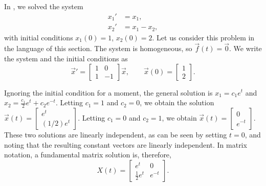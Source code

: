 \begin{example}
In , we solved the system
\begin{align*}
x_1' & = x_1 , \\
x_2' & = x_1 - x_2 ,
\end{align*}
with initial conditions $x_1(0) = 1$, $x_2(0) = 2$.
Let us consider this problem in the language of this section.
The system is homogeneous, so $\vec{f}(t) = \vec{0}$.
We write the system and the initial conditions as
\begin{equation*}
{\vec{x}}'
=
\begin{bmatrix}
1 & 0 \\
1 & -1
\end{bmatrix}
\vec{x} ,
\qquad
\vec{x}(0) = 
\begin{bmatrix}
1 \\
2
\end{bmatrix} .
\end{equation*}

Ignoring the initial condition for a moment,
the general solution is
$x_1 = c_1 e^t $ and
$x_2 = \frac{c_1}{2}e^{t} + c_2e^{-t}$. 
Letting $c_1=1$ and $c_2=0$, we obtain the solution
$\vec{x}(t) = \left[ \begin{smallmatrix} e^t \\ (1/2) e^t \end{smallmatrix} \right]$.
Letting $c_1=0$ and $c_2=1$, we obtain
$\vec{x}(t) = \left[ \begin{smallmatrix} 0 \\ e^{-t} \end{smallmatrix} \right]$.
These two solutions are linearly independent,
as can be seen by setting
$t=0$, and noting that the resulting constant vectors are
linearly independent.
In matrix notation, a fundamental matrix solution is, therefore,
\begin{equation*}
X(t) = 
\begin{bmatrix}
e^t & 0 \\
\frac{1}{2} e^t & e^{-t}
\end{bmatrix} .
\end{equation*}


\end{example}
